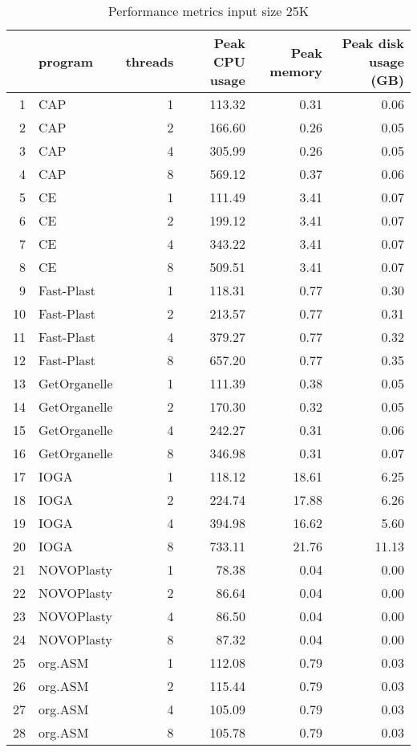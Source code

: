 \documentclass[oneside,10pt,A4]{scrartcl}
\begin{document}
\begin{table}[ht]
\caption{Performance metrics input size 25K}
\label{tab:perform25K_suppl}
\centering
\begin{tabular}{rlrrrr}
  \toprule
 & program & threads & Peak CPU usage & Peak memory & Peak disk usage (GB) \\ 
  \midrule
1 & CAP &   1 & 113.32 & 0.31 & 0.06 \\ 
  2 & CAP &   2 & 166.60 & 0.26 & 0.05 \\ 
  3 & CAP &   4 & 305.99 & 0.26 & 0.05 \\ 
  4 & CAP &   8 & 569.12 & 0.37 & 0.06 \\ 
  5 & CE &   1 & 111.49 & 3.41 & 0.07 \\ 
  6 & CE &   2 & 199.12 & 3.41 & 0.07 \\ 
  7 & CE &   4 & 343.22 & 3.41 & 0.07 \\ 
  8 & CE &   8 & 509.51 & 3.41 & 0.07 \\ 
  9 & Fast-Plast &   1 & 118.31 & 0.77 & 0.30 \\ 
  10 & Fast-Plast &   2 & 213.57 & 0.77 & 0.31 \\ 
  11 & Fast-Plast &   4 & 379.27 & 0.77 & 0.32 \\ 
  12 & Fast-Plast &   8 & 657.20 & 0.77 & 0.35 \\ 
  13 & GetOrganelle &   1 & 111.39 & 0.38 & 0.05 \\ 
  14 & GetOrganelle &   2 & 170.30 & 0.32 & 0.05 \\ 
  15 & GetOrganelle &   4 & 242.27 & 0.31 & 0.06 \\ 
  16 & GetOrganelle &   8 & 346.98 & 0.31 & 0.07 \\ 
  17 & IOGA &   1 & 118.12 & 18.61 & 6.25 \\ 
  18 & IOGA &   2 & 224.74 & 17.88 & 6.26 \\ 
  19 & IOGA &   4 & 394.98 & 16.62 & 5.60 \\ 
  20 & IOGA &   8 & 733.11 & 21.76 & 11.13 \\ 
  21 & NOVOPlasty &   1 & 78.38 & 0.04 & 0.00 \\ 
  22 & NOVOPlasty &   2 & 86.64 & 0.04 & 0.00 \\ 
  23 & NOVOPlasty &   4 & 86.50 & 0.04 & 0.00 \\ 
  24 & NOVOPlasty &   8 & 87.32 & 0.04 & 0.00 \\ 
  25 & org.ASM &   1 & 112.08 & 0.79 & 0.03 \\ 
  26 & org.ASM &   2 & 115.44 & 0.79 & 0.03 \\ 
  27 & org.ASM &   4 & 105.09 & 0.79 & 0.03 \\ 
  28 & org.ASM &   8 & 105.78 & 0.79 & 0.03 \\ 
   \bottomrule
\end{tabular}
\end{table}
\end{document}
